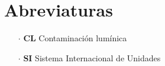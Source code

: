 \chapter{Abreviaturas}

\begin{itemize}

\item[$\cdot$] \textbf{CL} Contaminación lumínica

\item[$\cdot$] \textbf{SI} Sistema Internacional de Unidades
			
\end{itemize}